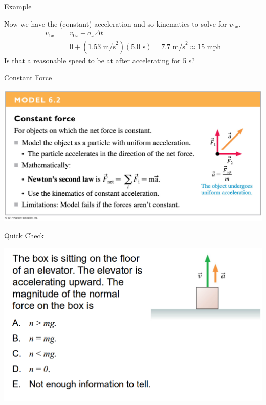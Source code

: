 \documentclass{beamer}
\newcommand{\red}[1]{{\color{red}{#1}}}
\newcommand{\checkL}[2]{\begin{textblock*}{1cm}(#1,#2){\Large \red{\Checkmark}}\end{textblock*}}
\begin{document}
\begin{frame}{Example}
\begin{center}
   Now we have the (constant) acceleration and so kinematics to solve for $v_{1x}$.
   \begin{align*}
      v_{1x} &= v_{0x}+a_x\Delta t \\
      &= 0+(1.53\text{ m/s}^2)(5.0\text{ s}) = 7.7\text{ m/s}^2 \approx 15\text{ mph}
   \end{align*}
   Is that a reasonable speed to be at after accelerating for 5 s?
\end{center}
\end{frame}

\begin{frame}{Constant Force}
\begin{center}
   \includegraphics[width=\textwidth]{../figures/06_ModelBox_02.jpg}
\end{center}
\end{frame}

\begin{frame}{Quick Check}
\begin{center}
   \includegraphics[width=\textwidth]{../figures/QC6_6.png}
\end{center}
\only<2>{\checkL{1.0cm}{4.4cm}}
\end{frame}
\end{document}
